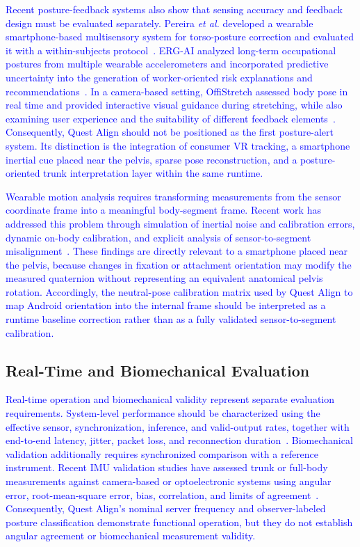 \documentclass[conference]{IEEEtran}
\newcommand{\CC}[1]{\textcolor{blue}{#1}}
\begin{document}
\CC{Recent posture-feedback systems also show that sensing accuracy and feedback design
must be evaluated separately. Pereira \textit{et al.} developed a wearable
smartphone-based multisensory system for torso-posture correction and evaluated it with a
within-subjects protocol~\cite{smartphone_torso_feedback}. ERG-AI analyzed long-term
occupational postures from multiple wearable accelerometers and incorporated predictive
uncertainty into the generation of worker-oriented risk explanations and
recommendations~\cite{ergai}. In a camera-based setting, OffiStretch assessed body pose in
real time and provided interactive visual guidance during stretching, while also examining
user experience and the suitability of different feedback elements~\cite{offistretch}.
Consequently, Quest Align should not be positioned as the first posture-alert system. Its
distinction is the integration of consumer VR tracking, a smartphone inertial cue
placed near the pelvis, sparse pose reconstruction, and a posture-oriented trunk
interpretation layer within the same runtime.}

\CC{Wearable motion analysis requires transforming measurements from the
sensor coordinate frame into a meaningful body-segment frame. Recent work has
addressed this problem through simulation of inertial noise and calibration
errors, dynamic on-body calibration, and explicit analysis of
sensor-to-segment misalignment~\cite{pnp,transformer_imu_calibrator,potter_alignment}.
These findings are directly relevant to a smartphone placed near the pelvis,
because changes in fixation or attachment orientation may modify the measured
quaternion without representing an equivalent anatomical pelvis rotation.
Accordingly, the neutral-pose calibration matrix used by Quest Align to map Android
orientation into the internal frame should be interpreted as a runtime baseline
correction rather than as a fully validated sensor-to-segment calibration.}

\subsection{Real-Time and Biomechanical Evaluation}

\CC{Real-time operation and biomechanical validity represent separate
evaluation requirements. System-level performance should be characterized using
the effective sensor, synchronization, inference, and valid-output rates,
together with end-to-end latency, jitter, packet loss, and reconnection
duration~\cite{mobileposer,diffusionposer,ultrainertialposer}. Biomechanical
validation additionally requires synchronized comparison with a reference
instrument. Recent IMU validation studies have assessed trunk or full-body
measurements against camera-based or optoelectronic systems using angular
error, root-mean-square error, bias, correlation, and limits of
agreement~\cite{ali_trunk_validation,camptocormia_imu,villa_imu_validation}.
Consequently, Quest Align's nominal server frequency and observer-labeled
posture classification demonstrate functional operation, but they do not
establish angular agreement or biomechanical measurement validity.}
\end{document}
